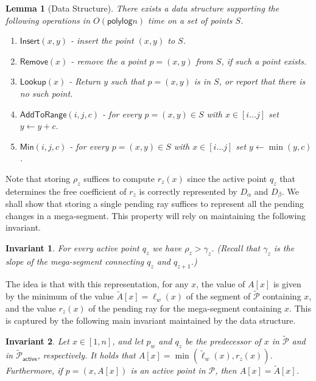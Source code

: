 \documentclass[10pt,a4paper]{article}
\newtheorem{lemma}[theorem]{Lemma}
\newcommand{\AtR}{\mathsf{AddToRange}}
\newcommand{\assign}{\leftarrow}
\newcommand{\local}{\text{short }}
\newcommand{\addmin}{\text{Add-min }}
\newcommand{\Insert}{\mathsf{Insert}}
\newcommand{\Remove}{\mathsf{Remove}}
\newcommand{\Lookup}{\mathsf{Lookup}}
\newcommand{\Min}{\mathsf{Min}}
\renewcommand{\P}{\mathcal{P}}
\newcommand{\TAP}{\tilde{\P}_{\mathsf{active}}}
\newcommand{\TA}{\tilde{A}}
\newcommand{\tell}{\tilde{\ell}}
\newcommand{\TP}{\tilde{\P}}
\newcommand{\ray}{r}
\newcommand{\rl}[1]{\rho_{#1}}
\newcommand{\polylog}{\mathsf{polylog}}
\newtheorem{invariant}{Invariant}
\begin{document}
\begin{lemma}[\addmin Data Structure]\label{lem:addminds}
      There exists a data structure supporting the following operations in $O(\polylog n)$ time on a set of points $S$. 
    \begin{enumerate}
        \item $\Insert(x,y)$ - insert the point $(x,y)$ to $S$.
        \item $\Remove(x)$ - remove the a point $p=(x,y)$ from $S$, if such a point exists.
        \item $\Lookup(x)$ - Return $y$ such that $p=(x,y)$ is in $S$, or report that there is no such point.
        \item $\AtR(i,j,c)$ - for every $p=(x,y)\in S$ with $x\in[i\ldots j]$ set $y\assign y +c$. 
        \item $\Min(i,j,c)$ - for every $p=(x,y)\in S$ with $x\in[i\ldots j]$ set $y \assign \min (y ,c)$. 
    \end{enumerate}
    \end{lemma}
    
Note that storing $\rl{z}$ suffices to compute $\ray_z(x)$ since the active point $q_z$ that determines the free coefficient of $\ray_z$ is correctly represented by $D_\alpha$ and $D_\beta$.  
We shall show that storing a single pending ray suffices to represent all the pending changes in a mega-segment. This property will rely on maintaining the following invariant.
\begin{invariant}\label{inv:rr_rl}
    For every active point $q_z$ we have $\rl{z}>\gamma_z$. (Recall that $\gamma_z$ is the slope of the mega-segment connecting $q_z$ and $q_{z+1}$.)
\end{invariant}

The idea is that with this representation, for any $x$, the value of $A[x]$ is given by the minimum of the value $\TA[x] = \ell_w(x)$ of the segment of $\TP$ containing $x$, and the value $\ray_z(x)$ of the pending \local ray for the mega-segment containing $x$. This is captured by the following main invariant maintained by the data structure.

\begin{invariant}\label{inv:lazyrs}
Let $x \in [1,n]$, and let $p_w$ and $q_z$ be the predecessor of $x$ in $\TP$ and in $\TAP$, respectively. 
It holds that $A[x] = \min (\tell_w(x), \ray_z(x))$. Furthermore, if $p=(x,A[x])$ is an active point in $\P$, then $A[x] = \TA[x]$.
\end{invariant}
\end{document}
